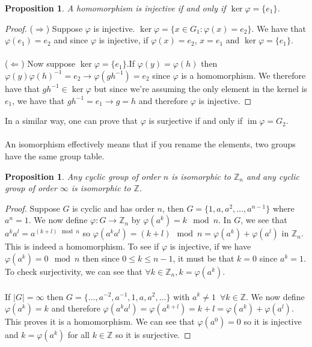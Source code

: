 \documentclass{article}
\newcommand{\Z}{\mathbb{Z}}
\DeclareMathOperator{\im}{im}
\newtheorem{proposition}[theorem]{Proposition}
\theoremstyle{definition}
\begin{document}
\begin{proposition}
    A homomorphism is injective if and only if $\ker \varphi = \{ e_1 \}$.
\end{proposition}
\begin{proof}
    ($\Rightarrow$) Suppose $\varphi$ is injective. $\ker \varphi = \{x \in G_1: \varphi(x)=e_2\}$. We have that $\varphi(e_1)=e_2$ and since $\varphi $ is injective, if $\varphi (x)=e_2$, $x=e_1$ and $\ker \varphi = \{e_1\}$. \\\\
    ($\Leftarrow$) Now suppose $\ker \varphi = \{ e_1\}$.If $\varphi (y)=\varphi(h)$ then $\varphi (y) \varphi (h)^{-1} = e_2 \rightarrow \varphi (gh^{-1}) =e_2$ since $\varphi$ is a homomorphism. We therefore have that $gh^{-1} \in \ker \varphi$ but since we're assuming the only element in the kernel is $e_1$, we have that $gh^{-1}=e_1 \rightarrow g=h$ and therefore $\varphi $ is injective.
\end{proof}
In a similar way, one can prove that $\varphi$ is surjective if and only if $\im \varphi = G_2$. \\\\
An isomorphism effectively means that if you rename the elements, two groups have the same group table. 
\begin{proposition}
    Any cyclic group of order $n$ is isomorphic to $\Z_n$ and any cyclic group of order $\infty$ is isomorphic to $\Z$.
\end{proposition}
\begin{proof}
    Suppose $G$ is cyclic and has order $n$, then $G=\{ 1,a,a^2,\ldots,a^{n-1}\}$ where $a^n=1$. We now define $\varphi : G\rightarrow \Z_n$ by $\varphi (a^k) = k \mod n$. In $G$, we see that $a^ka^l = a^{(k+l)\mod n}$ so $\varphi(a^ka^l) = (k+l)\mod n = \varphi(a^k)+\varphi(a^l)$ in $\Z_n$. This is indeed a homomorphism. To see if $\varphi$ is injective, if we have $\varphi (a^k) =0\mod n$ then since $0\leq k \leq n-1$, it must be that $k=0$ since $a^k=1$. To check surjectivity, we can see that $\forall k \in \Z_n, k=\varphi (a^k)$.\\\\
    If $|G| = \infty$ then $G=\{\ldots,a^{-2},a^{-1},1, a,a^2,\ldots\}$ with $a^k \neq 1 \,\,\, \forall k \in \Z$. We now define $\varphi (a^k)=k$ and therefore $\varphi(a^ka^l) = \varphi (a^{k+l})=k+l = \varphi(a^k)+\varphi (a^l)$. This proves it is a homomorphism. We can see that $\varphi(a^0) =0$ so it is injective and $k=\varphi(a^k)$ for all $k\in \Z$ so it is surjective.
\end{proof}
\end{document}
